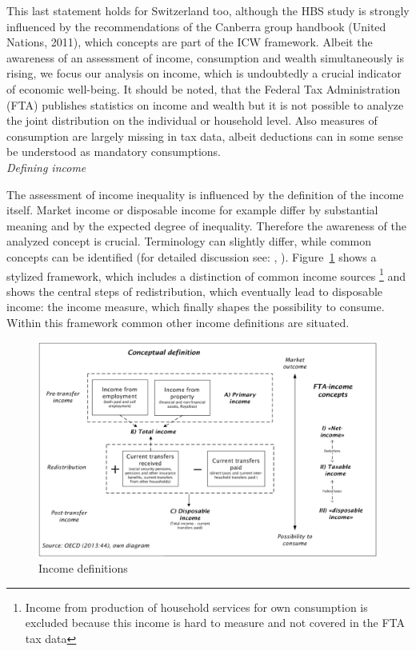 \documentclass[twoside]{article}\usepackage[]{graphicx}\usepackage[]{color}
\makeatletter
\def\maxwidth{ %
  \ifdim\Gin@nat@width>\linewidth
    \linewidth
  \else
    \Gin@nat@width
  \fi
}
\newcounter{tempcolnum}
\newcommand{\multicolinterrupt}[1]{%
\setcounter{tempcolnum}{\col@number}
\end{multicols}
#1%
\begin{multicols}{\value{tempcolnum}}
}
\makeatother
\begin{document}
\begin{multicols}{2}
This last statement holds for Switzerland too, although the HBS study is strongly influenced by the recommendations of the Canberra group handbook (United Nations, 2011), which concepts are part of the ICW framework. Albeit the awareness of an assessment of income, consumption and wealth simultaneously is rising, we focus our analysis on income, which is undoubtedly a crucial indicator of economic well-being. It should be noted, that the Federal Tax Administration (FTA) publishes statistics on income and wealth but it is not possible to analyze the joint distribution on the individual or household level. Also measures of consumption are largely missing in tax data, albeit deductions can in some sense be understood as mandatory consumptions.\\

\emph{Defining income}

The assessment of income inequality is influenced by the definition of the income itself. Market income or disposable income for example differ by substantial meaning and by the expected degree of inequality. Therefore the awareness of the analyzed concept is crucial. Terminology can slightly differ, while common concepts can be identified (for detailed discussion see: \citet[44]{oecd_oecd_2013}, \citet[24]{united_nations_canberra_2011}). Figure~\ref{fig:incdef} shows a stylized framework, which includes a distinction of common income sources \footnote{Income from production of household services for own consumption is excluded because this income is hard to measure and not covered in the FTA tax data} and shows the central steps of redistribution, which eventually lead to disposable income: the income measure, which finally shapes the possibility to consume. Within this framework common other income definitions are situated. 

\multicolinterrupt{
\begin{figure}[H]
\centering
\includegraphics[width=\maxwidth]{figure/income_definition}
\caption{Income definitions}
\label{fig:incdef}
\end{figure}
}


\end{multicols}
\end{document}
